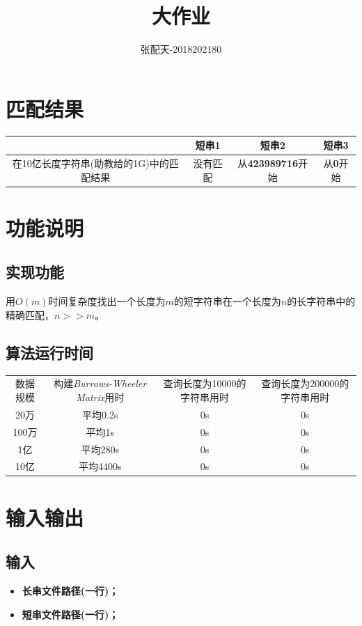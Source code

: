 \documentclass[UTF8]{ctexart}
\title{大作业}
\author{张配天-2018202180}
\begin{document}
    \maketitle
    \tableofcontents
    \clearpage
    \section{匹配结果}
    \begin{table}[H]
        \centering
        \begin{tabular}{c|c|c|c}
            \hline
            &短串1&短串2&短串3\\
            \hline
            在10亿长度字符串(助教给的1G)中的匹配结果&没有匹配&从\textbf{423989716}开始&从\textbf{0}开始\\
            \hline
        \end{tabular}
    \end{table}
    \section{功能说明}
    \subsection{实现功能}
    用$O(m)$时间复杂度找出一个长度为$m$的短字符串在一个长度为$n$的长字符串中的精确匹配，$n>>m$。
    \subsection{算法运行时间}
    \begin{table}[H]
        \centering
        \begin{tabular}{cccc}
            \hline
            数据规模&构建\emph{Burrows-Wheeler Matrix}用时&查询长度为10000的字符串用时&查询长度为200000的字符串用时\\
            20万&平均0.2s&0s&0s\\
            100万&平均1s&0s&0s\\
            1亿&平均280s&0s&0s\\
            10亿&平均4400s&0s&0s\\
            \hline
        \end{tabular}
    \end{table}
    \section{输入输出}
    \subsection{输入}
    \begin{itemize}
        \item \textbf{长串文件路径(一行)；}
        \item \textbf{短串文件路径(一行)；}
    \end{itemize}
    
\end{document}
